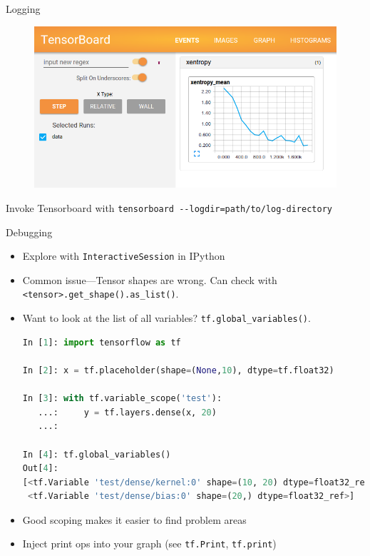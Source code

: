 \documentclass[]{beamer}
\begin{document}
\begin{frame}[fragile]{Logging}

\begin{figure}
  \centering
  \includegraphics[width=0.8\linewidth]{mnist_tensorboard.png}
\end{figure}

Invoke Tensorboard with \verb|tensorboard --logdir=path/to/log-directory|

\end{frame}

\begin{frame}[fragile]{Debugging}

\begin{itemize}
\item Explore with \verb|InteractiveSession| in IPython
\item Common issue---Tensor shapes are wrong. Can check with \verb|<tensor>.get_shape().as_list()|.
\item Want to look at the list of all variables? \verb|tf.global_variables()|.

\lstset{style=mystyle2}
\begin{lstlisting}[language=python]
In [1]: import tensorflow as tf

In [2]: x = tf.placeholder(shape=(None,10), dtype=tf.float32)

In [3]: with tf.variable_scope('test'):
   ...:     y = tf.layers.dense(x, 20)
   ...:     

In [4]: tf.global_variables()
Out[4]: 
[<tf.Variable 'test/dense/kernel:0' shape=(10, 20) dtype=float32_ref>,
 <tf.Variable 'test/dense/bias:0' shape=(20,) dtype=float32_ref>]
\end{lstlisting}
\item Good scoping makes it easier to find problem areas
\item Inject print ops into your graph (see \verb|tf.Print|, \verb|tf.print|)
\end{itemize}


\end{frame}
\end{document}
